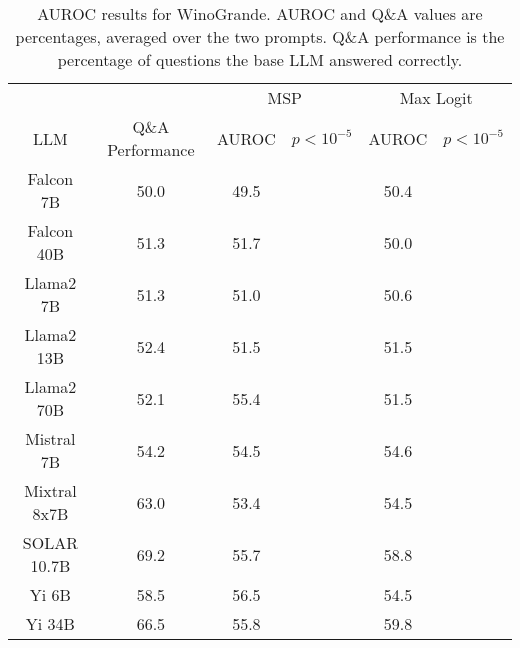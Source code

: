 \begin{table*}
\centering
\begin{tabular}{c|c|c|c|c|c}
& & \multicolumn{2}{c|}{MSP} & \multicolumn{2}{c}{Max Logit} \\ 
LLM & Q\&A Performance & AUROC & $p < 10^{-5}$ & AUROC & $p < 10^{-5}$\\ \hline
Falcon 7B & 50.0 & 49.5 &  & 50.4 & \\
Falcon 40B & 51.3 & 51.7 &  & 50.0 & \\
Llama2 7B & 51.3 & 51.0 &  & 50.6 & \\
Llama2 13B & 52.4 & 51.5 &  & 51.5 & \\
Llama2 70B & 52.1 & 55.4 &  & 51.5 & \\
Mistral 7B & 54.2 & 54.5 &  & 54.6 & \\
Mixtral 8x7B & 63.0 & 53.4 &  & 54.5 & \\
SOLAR 10.7B & 69.2 & 55.7 &  & 58.8 & \\
Yi 6B & 58.5 & 56.5 &  & 54.5 & \\
Yi 34B & 66.5 & 55.8 &  & 59.8 & \\
\hline
\end{tabular}
\caption{AUROC results for WinoGrande. AUROC and Q\&A values are percentages, averaged over the two prompts. Q\&A performance is the percentage of questions the base LLM answered correctly.}
\label{tab:winogrande_auroc}
\end{table*}
